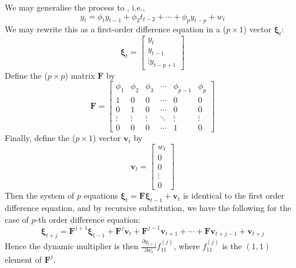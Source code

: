 We may generalise the process to , i.e.,
\begin{equation}
y_t = \phi_t y_{t-1} + \phi_2 t_{t-2} + \cdots + \phi_p y_{t-p} + w_t \nonumber
\end{equation}
We may rewrite this as a first-order difference equation in a ($p \times 1$) vector $\bm{\xi}_t$:
\begin{equation}
\bm{\xi}_t = 
\begin{bmatrix}
y_t \\
y_{t-1} \\ 
\vdots
y_{t-p+1}
\end{bmatrix} \nonumber
\end{equation}
Define the ($p \times p$) matrix $\bm{F}$ by
\begin{equation}
\bm{F} =
\begin{bmatrix}
\phi_1 & \phi_2 & \phi_3 & \cdots & \phi_{p-1} & \phi_p \\
1 & 0 & 0 & \cdots & 0 & 0 \\
0 & 1 & 0 & \cdots & 0 & 0 \\
\vdots & \vdots & \vdots & \ddots & \vdots & \vdots \\
0 & 0 & 0 & \cdots & 1 & 0
\end{bmatrix} \nonumber
\end{equation}
Finally, define the ($p \times 1$) vector $\bm{v}_t$ by
\begin{equation}
\bm{v}_t =
\begin{bmatrix}
w_t \\
0 \\
0 \\
\vdots \\
0
\end{bmatrix} \nonumber
\end{equation}
Then the system of $p$ equations $\bm{\xi}_t = \bm{F} \bm{\xi}_{t-1} + \bm{v}_t$ is identical to the first order difference equation, and by recursive substitution, we have the following for the case of $p$-th order difference equation:
\begin{equation}
\bm{\xi}_{t + j} = \bm{F}^{j+1} \bm{\xi}_{t-1} + \bm{F}^{j} \bm{v}_{t} + \bm{F}^{j-1} \bm{v}_{t+1} + \cdots + \bm{F} \bm{v}_{t+j-1} + \bm{v}_{t+j} \nonumber
\end{equation}
Hence the dynamic multiplier is then $\frac{\partial y_{t+j}}{\partial w_t} f^{(j)}_{11}$, where $f^{(j)}_{11}$ is the $(1,1)$ element of $\bm{F}^j$.